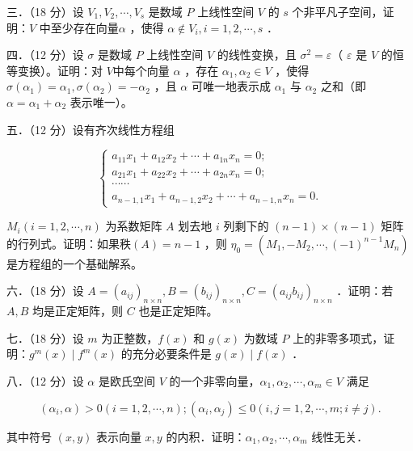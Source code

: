 \documentclass{article}
\begin{document}
三．（18 分）设 \(V_{1}, V_{2}, \cdots, V_{s}\) 是数域 \(P\) 上线性空间 \(V\) 的 \(s\) 个非平凡子空间，证明：\(V\) 中至少存在向量\(\alpha\) ，使得 \(\alpha \notin V_{i}, i=1,2, \cdots, s\) ．

四．（12 分）设 \(\sigma\) 是数域 \(P\) 上线性空间 \(V\) 的线性变换，且 \(\sigma^{2}=\varepsilon\)（ \(\varepsilon\) 是 \(V\) 的恒等变换）。证明：对 \(V\)中每个向量 \(\alpha\) ，存在 \(\alpha_{1}, \alpha_{2} \in V\) ，使得 \(\sigma\left(\alpha_{1}\right)=\alpha_{1}, \sigma\left(\alpha_{2}\right)=-\alpha_{2}\) ，且 \(\alpha\) 可唯一地表示成 \(\alpha_{1}\) 与 \(\alpha_{2}\) 之和（即 \(\alpha=\alpha_{1}+\alpha_{2}\) 表示唯一）。

五．（12 分）设有齐次线性方程组

\[
\left\{\begin{array}{c}
a_{11} x_{1}+a_{12} x_{2}+\cdots+a_{1 n} x_{n}=0 ; \\
a_{21} x_{1}+a_{22} x_{2}+\cdots+a_{2 n} x_{n}=0 ; \\
\cdots \cdots \\
a_{n-1,1} x_{1}+a_{n-1,2} x_{2}+\cdots+a_{n-1, n} x_{n}=0 .
\end{array}\right.
\]

\(M_{i}(i=1,2, \cdots, n)\) 为系数矩阵 \(A\) 划去地 \(i\) 列剩下的 \((n-1) \times(n-1)\) 矩阵的行列式。证明：如果秩\((A)=n-1\) ，则 \(\eta_{0}=\left(M_{1},-M_{2}, \cdots,(-1)^{n-1} M_{n}\right)\) 是方程组的一个基础解系。

六．（18 分）设 \(A=\left(a_{i j}\right)_{n \times n}, B=\left(b_{i j}\right)_{n \times n}, C=\left(a_{i j} b_{i j}\right)_{n \times n}\) ．证明：若 \(A, B\) 均是正定矩阵，则 \(C\) 也是正定矩阵。

七．（18 分）设 \(m\) 为正整数，\(f(x)\) 和 \(g(x)\) 为数域 \(P\) 上的非零多项式，证明：\(g^{m}(x) \mid f^{m}(x)\) 的充分必要条件是 \(g(x) \mid f(x)\) ．

八．（12 分）设 \(\alpha\) 是欧氏空间 \(V\) 的一个非零向量，\(\alpha_{1}, \alpha_{2}, \cdots, \alpha_{m} \in V\) 满足

\[
\left(\alpha_{i}, \alpha\right)>0(i=1,2, \cdots, n) ;\left(\alpha_{i}, \alpha_{j}\right) \leq 0(i, j=1,2, \cdots, m ; i \neq j) .
\]

其中符号 \((x, y)\) 表示向量 \(x, y\) 的内积．证明：\(\alpha_{1}, \alpha_{2}, \cdots, \alpha_{m}\) 线性无关．
\end{document}
